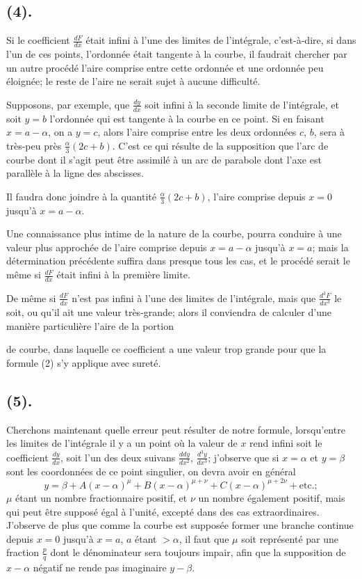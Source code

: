 \documentclass{article}
\begin{document}
\subsection*{(4).}

Si le coefficient $\frac{dF}{dx}$ était infini à l'une des limites de l'intégrale, c'est-à-dire, si dans l'un de ces points, l'ordonnée était tangente à la courbe, il faudrait chercher par un autre procédé l'aire comprise entre cette ordonnée et une ordonnée peu éloignée; le reste de l'aire ne serait sujet à aucune difficulté.

Supposons, par exemple, que $\frac{dy}{dx}$ soit infini à la seconde limite de l'intégrale, et soit $y=b$ l'ordonnée qui est tangente à la courbe en ce point. Si en faisant $x=a-\alpha$, on a $y=c$, alors l'aire comprise entre les deux ordonnées $c$, $b$, sera à très-peu près $\frac{\alpha}{3}(2c+b)$. C'est ce qui résulte de la supposition que l'arc de courbe dont il s'agit peut être assimilé à un arc de parabole dont l'axe est parallèle à la ligne des abscisses.

Il faudra donc joindre à la quantité $\frac{\alpha}{3}(2c+b)$, l'aire comprise depuis $x=0$ jusqu'à $x=a-\alpha$.

Une connaissance plus intime de la nature de la courbe, pourra conduire à une valeur plus approchée de l'aire comprise depuis $x=a-\alpha$ jusqu'à $x=a$; mais la détermination précédente suffira dans presque tous les cas, et le procédé serait le même si $\frac{dF}{dx}$ était infini à la première limite.

De même si $\frac{dF}{dx}$ n'est pas infini à l'une des limites de l'intégrale, mais que $\frac{d^{3}F}{dx^{3}}$ le soit, ou qu'il ait une valeur très-grande; alors il conviendra de calculer d'une manière particulière l'aire de la portion

de courbe, dans laquelle ce coefficient a une valeur trop grande pour que la formule (2) s'y applique avec sureté.

\subsection*{(5).}

Cherchons maintenant quelle erreur peut résulter de notre formule, lorsqu'entre les limites de l'intégrale il y a un point où la valeur de $x$ rend infini soit le coefficient $\frac{dy}{dx}$, soit l'un des deux suivans $\frac{ddy}{dx^{2}}$, $\frac{d^{3}y}{dx^{3}}$; j'observe que si $x=\alpha$ et $y=\beta$ sont les coordonnées de ce point singulier, on devra avoir en général
\[ y=\beta+A(x-\alpha)^{\mu}+B(x-\alpha)^{\mu+\nu}+C(x-\alpha)^{\mu+2\nu}+\text{etc.}; \]
$\mu$ étant un nombre fractionnaire positif, et $\nu$ un nombre également positif, mais qui peut être supposé égal à l'unité, excepté dans des cas extraordinaires. J'observe de plus que comme la courbe est supposée former une branche continue depuis $x=0$ jusqu'à $x=a$, $a$ étant $>\alpha$, il faut que $\mu$ soit représenté par une fraction $\frac{p}{q}$ dont le dénominateur sera toujours impair, afin que la supposition de $x-\alpha$ négatif ne rende pas imaginaire $y-\beta$.
\end{document}
